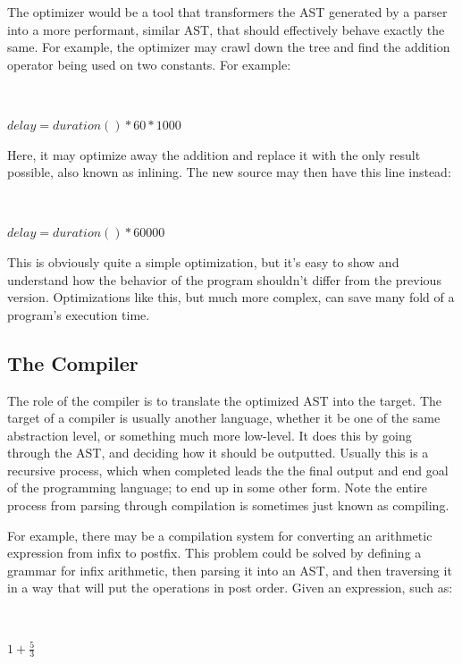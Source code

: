 \documentclass[titlepage]{article}
\begin{document}
			The optimizer would be a tool that transformers the AST generated by a parser into a more performant, similar AST, that should effectively behave exactly the same.  For example, the optimizer may crawl down the tree and find the addition operator being used on two constants.  For example:
			\newline

			~\centerline{$delay = duration() * 60 * 1000$}
			\newline

			Here, it may optimize away the addition and replace it with the only result possible, also known as inlining.  The new source may then have this line instead:
			\newline

			~\centerline{$delay = duration() * 60000$}
			\newline

			This is obviously quite a simple optimization, but it's easy to show and understand how the behavior of the program shouldn't differ from the previous version.  Optimizations like this, but much more complex, can save many fold of a program's execution time.

		\subsection{The Compiler}

			The role of the compiler is to translate the optimized AST into the target.  The target of a compiler is usually another language, whether it be one of the same abstraction level, or something much more low-level.  It does this by going through the AST, and deciding how it should be outputted.  Usually this is a recursive process, which when completed leads the the final output and end goal of the programming language; to end up in some other form.  Note the entire process from parsing through compilation is sometimes just known as compiling.

			For example, there may be a compilation system for converting an arithmetic expression from infix to postfix.  This problem could be solved by defining a grammar for infix arithmetic, then parsing it into an AST, and then traversing it in a way that will put the operations in post order.  Given an expression, such as:
			\newline

			~\centerline{\Large{$1 + \frac{5}{3}$}}
			\newline
\end{document}
